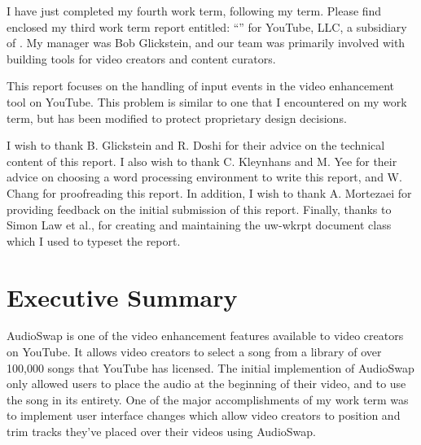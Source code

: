 \documentclass[se,resubmit]{uw-wkrpt}
\begin{document}
\frontmatter

\begin{letter}
I have just completed my fourth work term, following my \theterm{} term.
Please find enclosed my third work term report entitled: ``\thetitle'' for
YouTube, LLC, a subsidiary of \theemployer.  My manager was Bob
Glickstein, and our team was primarily involved with building tools for
video creators and content curators.

This report focuses on the handling of input events in the video
enhancement tool on YouTube. This problem is similar to one that I
encountered on my work term, but has been modified to protect proprietary
design decisions.

I wish to thank B. Glickstein and R. Doshi for their advice on the
technical content of this report. I also wish to thank C. Kleynhans and M.
Yee for their advice on choosing a word processing environment to write
this report, and W. Chang for proofreading this report. In addition, I
wish to thank A. Mortezaei for providing feedback on the initial
submission of this report. Finally, thanks to Simon Law et al., for
creating and maintaining the \textsf{uw-wkrpt} document class which I used
to typeset the report.
\end{letter}

\section{Executive Summary}
AudioSwap is one of the video enhancement features available to video
creators on YouTube. It allows video creators to select a song from a
library of over 100,000 songs that YouTube has licensed. The initial
implemention of AudioSwap only allowed users to place the audio at the
beginning of their video, and to use the song in its entirety. One of the
major accomplishments of my work term was to implement user interface
changes which allow video creators to position and trim tracks they've
placed over their videos using AudioSwap.
\end{document}
